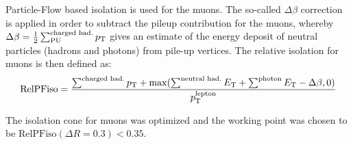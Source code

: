 Particle-Flow based isolation is  used for the muons.
The so-called $\Delta\beta$ correction is applied in order to subtract the pileup contribution for the muons, 
whereby $\Delta\beta = \frac{1}{2} \sum^\text{charged had.}_\text{PU} p_{\mathrm{T}}$  gives an estimate of the energy deposit of neutral particles (hadrons and photons) from pile-up vertices. 
The relative isolation for muons is then defined as:
\begin{equation}
\text{RelPFiso} = \frac{\sum^\text{charged had.} p_{\mathrm{T}} + \max(\sum^\text{neutral had.} E_{\mathrm{T}} 
+ \sum^\text{photon} E_{\mathrm{T}} - \Delta \beta, 0)}{p_{\mathrm{T}}^\text{lepton}}
\label{eqn:mupfiso}
\end{equation}

The isolation cone for muons was optimized and the working point was chosen to be $\text{RelPFiso}(\Delta R = 0.3) < 0.35$. 
